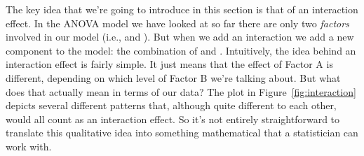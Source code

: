
The key idea that we're going to introduce in this section is that of an interaction effect. In the ANOVA model we have looked at so far there are only two {\it factors} involved in our model (i.e.,  and ). But when we add an interaction we add a new component to the model: the combination of  and . Intuitively, the idea behind an interaction effect is fairly simple. It just means that the effect of Factor A is different, depending on which level of Factor B we're talking about. But what does that actually mean in terms of our data? The plot in Figure~\ref{fig:interaction} depicts several different patterns that, although quite different to each other, would all count as an interaction effect. So it's not entirely straightforward to translate this qualitative idea into something mathematical that a statistician can work with. 


